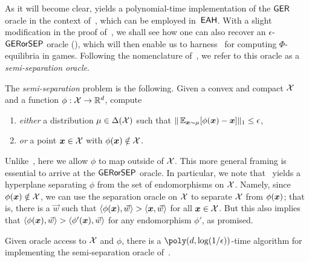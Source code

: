 As it will become clear,  yields a polynomial-time implementation of the $\textsf{GER}$ oracle in the context of~, which can be employed in~$\textsf{EAH}$. With a slight modification in the proof of~, we shall see how one can also recover an $\epsilon$-$\textsf{GERorSEP}$ oracle (), which will then enable us to harness~ for computing $\Phi$-equilibria in games. Following the nomenclature of~\citet{Daskalakis24:Efficient}, we refer to this oracle as a \emph{semi-separation oracle}.

\begin{definition}
    \label{def:semiseparation}
    The \emph{semi-separation} problem is the following. Given a convex and compact ${\mathcal{X}}$ and a function $\phi : {\mathcal{X}} \to \mathbb R^d$, compute
    \begin{enumerate}
        \item {\em either} a distribution $\mu \in \Delta({\mathcal{X}})$ such that $\|\operatorname*{\mathbb E}_{{\bm{x}} \sim \mu}[\phi({\bm{x}})-{\bm{x}}] \|_1 \leq \epsilon$, \label{item:efp}
        \item {\em or} a point ${\bm{x}}\in{\mathcal{X}}$ with $\phi({\bm{x}}) \notin {\mathcal{X}}$.\label{item:mem}
    \end{enumerate}
\end{definition}

Unlike~, here we allow $\phi$ to map outside of ${\mathcal{X}}$. This more general framing is essential to arrive at the $\textsf{GERorSEP}$ oracle. In particular, we note that~ yields a hyperplane separating $\phi$ from the set of endomorphisms on ${\mathcal{X}}$. Namely, since $\phi({\bm{x}}) \notin {\mathcal{X}}$, we can use the separation oracle on ${\mathcal{X}}$ to separate ${\mathcal{X}}$ from $\phi({\bm{x}})$; that is, there is a $\vec{w}$ such that $\langle \phi({\bm{x}}), \vec{w} \rangle > \langle {\bm{x}}, \vec{w} \rangle$ for all ${\bm{x}} \in {\mathcal{X}}$. But this also implies that $\langle \phi({\bm{x}}), \vec{w} \rangle > \langle \phi'({\bm{x}}), \vec{w} \rangle$ for any endomorphism $\phi'$, as promised.

\begin{theorem}
    \label{theorem:semiseparation}
    Given oracle access to ${\mathcal{X}}$ and $\phi$, there is a $\poly(d, \log(1/\epsilon))$-time algorithm for implementing the semi-separation oracle of~.
\end{theorem}

